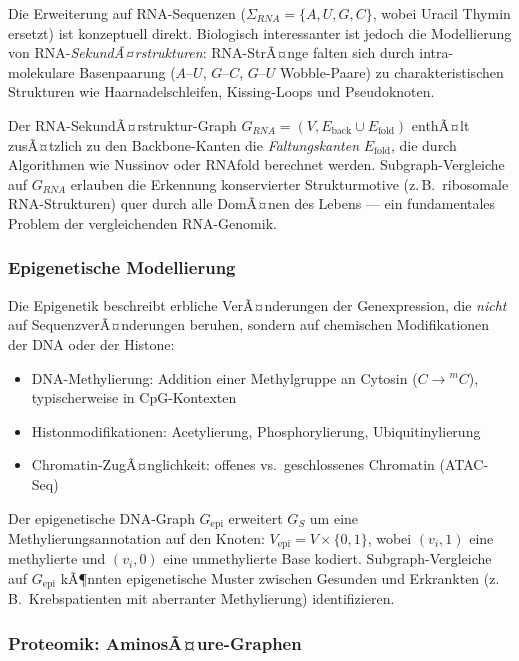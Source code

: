 ﻿\documentclass[a4paper,12pt]{article}
\theoremstyle{definition}
\begin{document}
Die Erweiterung auf RNA-Sequenzen ($\Sigma_{RNA} = \{A, U, G, C\}$,
wobei Uracil Thymin ersetzt) ist konzeptuell direkt. Biologisch interessanter
ist jedoch die Modellierung von RNA-\textit{SekundÃ¤rstrukturen}: RNA-StrÃ¤nge
falten sich durch intra-molekulare Basenpaarung ($A$--$U$, $G$--$C$, $G$--$U$
Wobble-Paare) zu charakteristischen Strukturen wie Haarnadelschleifen,
Kissing-Loops und Pseudoknoten.

Der RNA-SekundÃ¤rstruktur-Graph $G_{RNA} = (V, E_{\text{back}} \cup E_{\text{fold}})$
enthÃ¤lt zusÃ¤tzlich zu den Backbone-Kanten die \textit{Faltungskanten}
$E_{\text{fold}}$, die durch Algorithmen wie Nussinov oder RNAfold berechnet werden.
Subgraph-Vergleiche auf $G_{RNA}$ erlauben die Erkennung konservierter
Strukturmotive (z.\,B.\ ribosomale RNA-Strukturen) quer durch alle DomÃ¤nen des
Lebens --- ein fundamentales Problem der vergleichenden RNA-Genomik.

\subsubsection{Epigenetische Modellierung}

Die Epigenetik beschreibt erbliche VerÃ¤nderungen der Genexpression, die
\textit{nicht} auf SequenzverÃ¤nderungen beruhen, sondern auf chemischen
Modifikationen der DNA oder der Histone:
\begin{itemize}
	\item DNA-Methylierung: Addition einer Methylgruppe an Cytosin
	($C \to {}^m C$), typischerweise in CpG-Kontexten
	\item Histonmodifikationen: Acetylierung, Phosphorylierung, Ubiquitinylierung
	\item Chromatin-ZugÃ¤nglichkeit: offenes vs.\ geschlossenes Chromatin (ATAC-Seq)
\end{itemize}

Der epigenetische DNA-Graph $G_{\text{epi}}$ erweitert $G_S$ um eine
Methylierungsannotation auf den Knoten: $V_{\text{epi}} = V \times \{0, 1\}$,
wobei $(v_i, 1)$ eine methylierte und $(v_i, 0)$ eine unmethylierte Base
kodiert. Subgraph-Vergleiche auf $G_{\text{epi}}$ kÃ¶nnten epigenetische Muster
zwischen Gesunden und Erkrankten (z.\,B.\ Krebspatienten mit aberranter
Methylierung) identifizieren.

\subsubsection{Proteomik: AminosÃ¤ure-Graphen}
\end{document}
